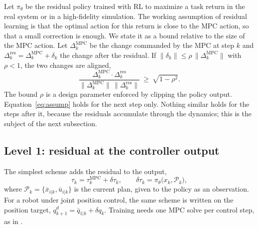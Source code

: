 \documentclass[conference]{IEEEtran}
\newcommand{\mpc}{\mathrm{MPC}}
\newcommand{\xb}{\bar{x}}
\newcommand{\ub}{\bar{u}}
\begin{document}
Let $\pi_\theta$ be the residual policy trained with RL to maximize a task return in the real system or in a high-fidelity simulation.
The working assumption of residual learning is that the optimal action for this return is close to the MPC action, so that a small correction is enough.
We state it as a bound relative to the size of the MPC action.
Let $\Delta^{\mpc}_k$ be the change commanded by the MPC at step $k$ and $\Delta^{\mathrm{res}}_k=\Delta^{\mpc}_k+\delta_k$ the change after the residual.
If $\|\delta_k\|\le\rho\,\|\Delta^{\mpc}_k\|$ with $\rho<1$, the two changes are aligned,
\begin{equation}
\frac{\Delta^{\mpc}_k\cdot\Delta^{\mathrm{res}}_k}{\|\Delta^{\mpc}_k\|\,\|\Delta^{\mathrm{res}}_k\|}\ \ge\ \sqrt{1-\rho^2}.
\label{eq:assump}
\end{equation}
The bound $\rho$ is a design parameter enforced by clipping the policy output.
Equation~\eqref{eq:assump} holds for the next step only.
Nothing similar holds for the steps after it, because the residuals accumulate through the dynamics; this is the subject of the next subsection.

\subsection{Level 1: residual at the controller output}
\label{sec:l1}
The simplest scheme adds the residual to the output,
\begin{equation}
\tau_k=\tau^{\mpc}_k+\delta\tau_k,\qquad \delta\tau_k=\pi_\theta\big(x_k,\mathcal P_k\big),
\label{eq:l1}
\end{equation}
where $\mathcal P_k=\{\xb_{i|k},\ub_{i|k}\}$ is the current plan, given to the policy as an observation.
For a robot under joint position control, the same scheme is written on the position target, $q^d_{k+1}=\bar q_{1|k}+\delta q_k$.
Training needs one MPC solve per control step, as in \cite{jeon2025residualmpc}.
\end{document}
